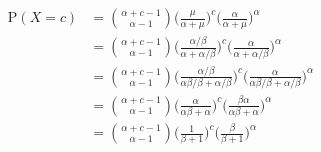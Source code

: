 \begin{align*}
\textrm{P}(X=c) & = \binom{\alpha+c-1}{\alpha-1}\Bigg (\frac{\mu}{\alpha+\mu}\Bigg)^{c} \Bigg(\frac{\alpha}{\alpha+\mu}\Bigg)^{\alpha} \\
& = \binom{\alpha+c-1}{\alpha-1}\Bigg (\frac{\alpha/\beta}{\alpha+\alpha/\beta}\Bigg)^{c} \Bigg(\frac{\alpha}{\alpha+\alpha/\beta}\Bigg)^{\alpha} \\
& = \binom{\alpha+c-1}{\alpha-1}\Bigg (\frac{\alpha/\beta}{\alpha\beta/\beta+\alpha/\beta}\Bigg)^{c} \Bigg(\frac{\alpha}{\alpha\beta/\beta+\alpha/\beta}\Bigg)^{\alpha} \\
& = \binom{\alpha+c-1}{\alpha-1}\Bigg (\frac{\alpha}{\alpha\beta+\alpha}\Bigg)^{c} \Bigg(\frac{\beta\alpha}{\alpha\beta+\alpha}\Bigg)^{\alpha} \\
&= \binom{\alpha+c-1}{\alpha-1}\Bigg (\frac{1}{\beta+1}\Bigg)^{c} \Bigg(\frac{\beta}{\beta+1}\Bigg)^{\alpha}
\end{align*}



% 
% 


